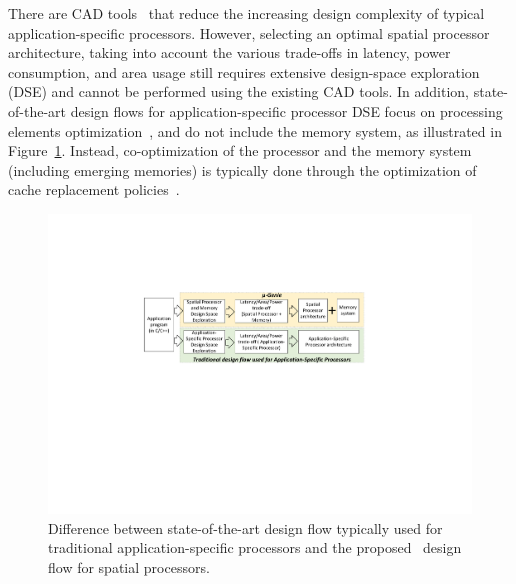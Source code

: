 There are CAD tools~\cite{synopsystool,tensilica,codasiptool} that reduce the increasing design complexity of typical application-specific processors. However, selecting an optimal spatial processor architecture, taking into account the various trade-offs in latency, power consumption, and area usage still requires extensive design-space exploration (DSE) and cannot be performed using the existing CAD tools.
In addition, state-of-the-art design flows for application-specific processor DSE focus on processing elements optimization~\cite{Meloni2012,EusseSAMOS2014,Jozwiak2013}, and do not include the memory system, as illustrated in Figure~\ref{fig:intro}. Instead, co-optimization of the processor and the memory system (including emerging memories) is typically done through the optimization of cache replacement policies~\cite{4798259,7092595,6271803}.

\begin{figure}[ht]
    \centering
    \includegraphics[clip, trim=6cm 10.5cm 6.4cm 5.2cm, width=1.0\linewidth]{images/intro_figure.pdf} %
    \caption{\small Difference between state-of-the-art design flow typically used for traditional application-specific processors and the proposed \frameworkname~design flow for spatial processors.}
    \label{fig:intro}
\end{figure}


